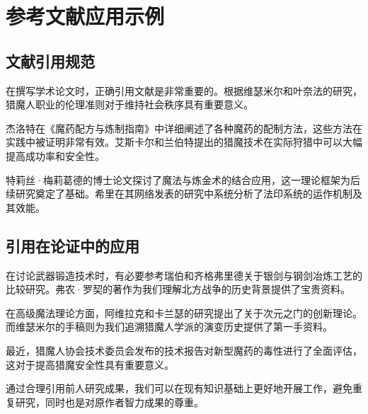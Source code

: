 \section{参考文献应用示例}

\subsection{文献引用规范}

在撰写学术论文时，正确引用文献是非常重要的。根据维瑟米尔和叶奈法的研究\cite{ref1}，猎魔人职业的伦理准则对于维持社会秩序具有重要意义。

杰洛特在《魔药配方与炼制指南》\cite{ref2}中详细阐述了各种魔药的配制方法，这些方法在实践中被证明非常有效。艾斯卡尔和兰伯特\cite{ref3}提出的猎魔技术在实际狩猎中可以大幅提高成功率和安全性。

特莉丝·梅莉葛德的博士论文\cite{ref4}探讨了魔法与炼金术的结合应用，这一理论框架为后续研究奠定了基础。希里在其网络发表的研究中\cite{ref5}系统分析了法印系统的运作机制及其效能。

\subsection{引用在论证中的应用}

在讨论武器锻造技术时，有必要参考瑞伯和齐格弗里德关于银剑与钢剑冶炼工艺的比较研究\cite{ref6}。弗农·罗契的著作\cite{ref7}为我们理解北方战争的历史背景提供了宝贵资料。

在高级魔法理论方面，阿维拉克和卡兰瑟的研究\cite{ref8}提出了关于次元之门的创新理论。而维瑟米尔的手稿\cite{ref9}则为我们追溯猎魔人学派的演变历史提供了第一手资料。

最近，猎魔人协会技术委员会发布的技术报告\cite{ref10}对新型魔药的毒性进行了全面评估，这对于提高猎魔安全性具有重要意义。

通过合理引用前人研究成果，我们可以在现有知识基础上更好地开展工作，避免重复研究，同时也是对原作者智力成果的尊重。